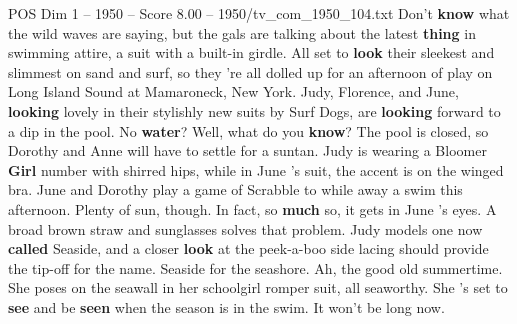 \begin{textsample}{POS Dim 1 – 1950 – Score 8.00 – 1950/tv\_com\_1950\_104.txt}  \label{ex:f1_pos_017}
Don't \textbf{know} what the wild waves are saying, but the gals are talking about the latest \textbf{thing} in swimming attire, a suit with a built-in girdle.
All set to \textbf{look} their sleekest and slimmest on sand and surf, so they 're all dolled up for an afternoon of play on Long Island Sound at Mamaroneck, New York.
Judy, Florence, and June, \textbf{looking} lovely in their stylishly new suits by Surf Dogs, are \textbf{looking} forward to a dip in the pool.
No \textbf{water}?
Well, what do you \textbf{know}?
The pool is closed, so Dorothy and Anne will have to settle for a suntan.
Judy is wearing a Bloomer \textbf{Girl} number with shirred hips, while in June 's suit, the accent is on the winged bra.
June and Dorothy play a game of Scrabble to while away a swim this afternoon.
Plenty of sun, though.
In fact, so \textbf{much} so, it gets in June 's eyes.
A broad brown straw and sunglasses solves that problem.
Judy models one now \textbf{called} Seaside, and a closer \textbf{look} at the peek-a-boo side lacing should provide the tip-off for the name.
Seaside for the seashore.
Ah, the good old summertime.
She poses on the seawall in her schoolgirl romper suit, all seaworthy.
She 's set to \textbf{see} and be \textbf{seen} when the season is in the swim.
It won't be long now.

\end{textsample}
